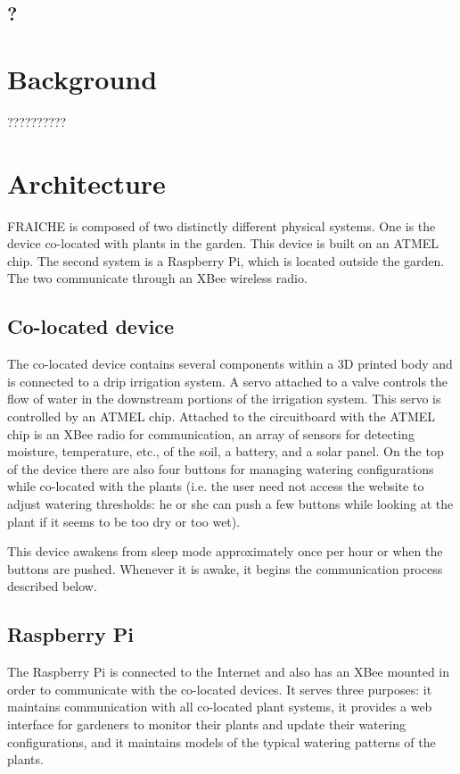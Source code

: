 \documentclass[a4paper]{acm_proc_article-sp}
\begin{document}
\subsection{?}

\section{Background}

??????????

\section{Architecture}

FRAICHE is composed of two distinctly different physical systems.  One is the device co-located with plants in the garden.  This device is built on an ATMEL chip.  The second system is a Raspberry Pi, which is located outside the garden.  The two communicate through an XBee wireless radio.

\subsection{Co-located device}

The co-located device contains several components within a 3D printed body and is connected to a drip irrigation system.  A servo attached to a valve controls the flow of water in the downstream portions of the irrigation system.  This servo is controlled by an ATMEL chip.  Attached to the circuitboard with the ATMEL chip is an XBee radio for communication, an array of sensors for detecting moisture, temperature, etc., of the soil, a battery, and a solar panel.  On the top of the device there are also four buttons for managing watering configurations while co-located with the plants (i.e. the user need not access the website to adjust watering thresholds: he or she can push a few buttons while looking at the plant if it seems to be too dry or too wet).

This device awakens from sleep mode approximately once per hour or when the buttons are pushed.  Whenever it is awake, it begins the communication process described below.

\subsection{Raspberry Pi}

The Raspberry Pi is connected to the Internet and also has an XBee mounted in order to communicate with the co-located devices.  It serves three purposes: it maintains communication with all co-located plant systems, it provides a web interface for gardeners to monitor their plants and update their watering configurations, and it maintains models of the typical watering patterns of the plants.
\end{document}
